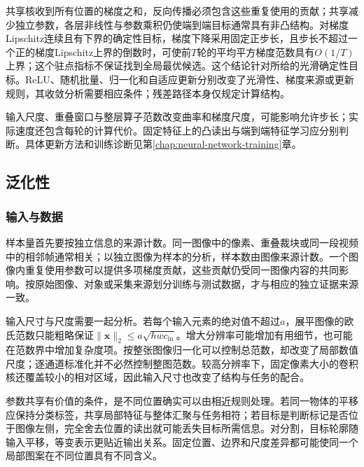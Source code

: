 共享核收到所有位置的梯度之和，反向传播必须包含这些重复使用的贡献；共享减少独立参数，各层非线性与参数乘积仍使端到端目标通常具有非凸结构。对梯度Lipschitz连续且有下界的确定性目标，梯度下降采用固定正步长，且步长不超过一个正的梯度Lipschitz上界的倒数时，可使前$T$轮的平均平方梯度范数具有$O(1/T)$上界；这个驻点指标不保证找到全局最优候选。这个结论针对所给的光滑确定性目标。ReLU、随机批量、归一化和自适应更新分别改变了光滑性、梯度来源或更新规则，其收敛分析需要相应条件；残差路径本身仅规定计算结构。

输入尺度、重叠窗口与整层算子范数改变曲率和梯度尺度，可能影响允许步长；实际速度还包含每轮的计算代价。固定特征上的凸读出与端到端特征学习应分别判断。具体更新方法和训练诊断见第\ref{chap:neural-network-training}章。

\subsection{泛化性}
\label{sec:cnn-generalization}

\subsubsection{输入与数据}
\label{sec:cnn-data-generalization}

样本量首先要按独立信息的来源计数。同一图像中的像素、重叠裁块或同一段视频中的相邻帧通常相关；以独立图像为样本的分析，样本数由图像来源计数。一个图像内重复使用参数可以提供多项梯度贡献，这些贡献仍受同一图像内容的共同影响。按原始图像、对象或采集来源划分训练与测试数据，才与相应的独立证据来源一致。

输入尺寸与尺度需要一起分析。若每个输入元素的绝对值不超过$a$，展平图像的欧氏范数只能粗略保证$\lVert\bm x\rVert_2\leq a\sqrt{hwc_{\mathrm{in}}}$。增大分辨率可能增加有用细节，也可能在范数界中增加复杂度项。按整张图像归一化可以控制总范数，却改变了局部数值尺度；逐通道标准化并不必然控制整图范数。较高分辨率下，固定像素大小的卷积核还覆盖较小的相对区域，因此输入尺寸也改变了结构与任务的配合。

参数共享有价值的条件，是不同位置确实可以由相近规则处理。若同一物体的平移应保持分类标签，共享局部特征与整体汇聚与任务相符；若目标是判断标记是否位于图像左侧，完全舍去位置的读出就可能丢失目标所需信息。对分割，目标轮廓随输入平移，等变表示更贴近输出关系。固定位置、边界和尺度差异都可能使同一个局部图案在不同位置具有不同含义。

